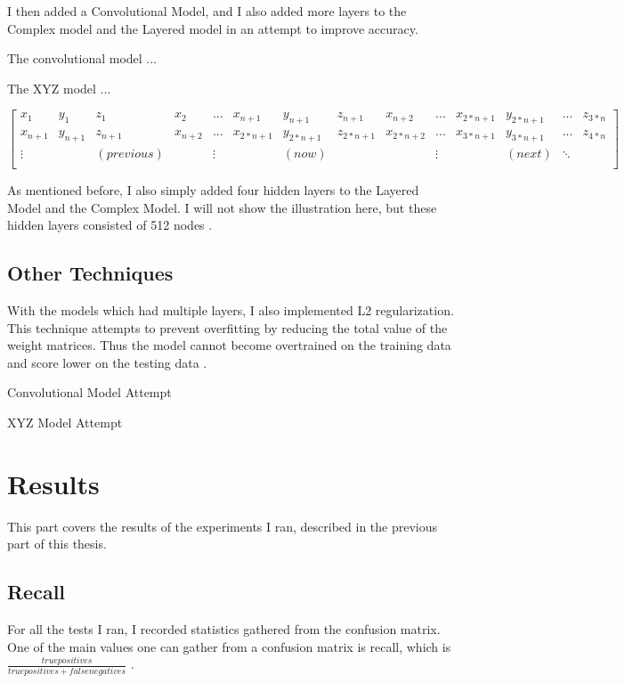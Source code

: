 \documentclass[]{report}
\begin{document}
I then added a Convolutional Model, and I also added more layers to the Complex model and the Layered model in an attempt to improve accuracy.

The convolutional model ...

The XYZ model ...


$$
\left[
\begin{array}{cccccccccccccc}
x_{1} & y_{1} & z_{1} & x_{2} & ... & x_{n+1} & y_{n+1} & z_{n+1} & x_{n+2} & ... & x_{2*n+1} & y_{2*n+1} & ... & z_{3*n} \\
x_{n+1} & y_{n+1} & z_{n+1} & x_{n+2} & ... & x_{2*n+1} & y_{2*n+1} & z_{2*n+1} & x_{2*n+2} & ... & x_{3*n+1} & y_{3*n+1} & ... & z_{4*n} \\
\vdots & & (previous) & & \vdots & & (now) & &  & \vdots & & (next) & \ddots\\
\end{array}
\right]
$$

As mentioned before, I also simply added four hidden layers to the Layered Model and the Complex Model. I will not show the illustration here, but these hidden layers consisted of 512 nodes \cite{Goodfellow-et-al-2016}. 

\section{Other Techniques}

With the models which had multiple layers, I also implemented L2 regularization. This technique attempts to prevent overfitting by reducing the total value of the weight matrices. Thus the model cannot become overtrained on the training data and score lower on the testing data \cite{Hammerla}.

Convolutional Model Attempt

XYZ Model Attempt

\chapter{Results}

This part covers the results of the experiments I ran, described in the previous part of this thesis.

\section{Recall}

For all the tests I ran, I recorded statistics gathered from the confusion matrix. One of the main values one can gather from a confusion matrix is recall, which is $\frac{truepositives}{truepositives + falsenegatives} $ \cite{ThreeGiants}.
\end{document}
